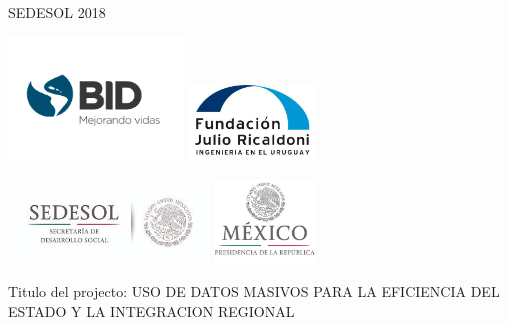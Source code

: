 \begin{center}
SEDESOL 2018
\vspace{2cm}

  \begin{center}




\begin{multicols}{2}
\includegraphics[width=0.35\textwidth]{images/bid}
\includegraphics[width=0.25\textwidth]{images/LOGO_FJR}
\end{multicols}
\begin{multicols}{2}
\includegraphics[width=0.4\textwidth]{images/sedesol}
\includegraphics[width=0.2\textwidth]{images/presidencia}
\end{multicols}


  \vspace{2mm}

  \end{center}
  \vspace{1cm}
  {\Large Titulo del projecto: USO DE DATOS MASIVOS PARA LA EFICIENCIA DEL ESTADO Y LA INTEGRACION REGIONAL\\}
  \vspace{2cm}


\end{center}

